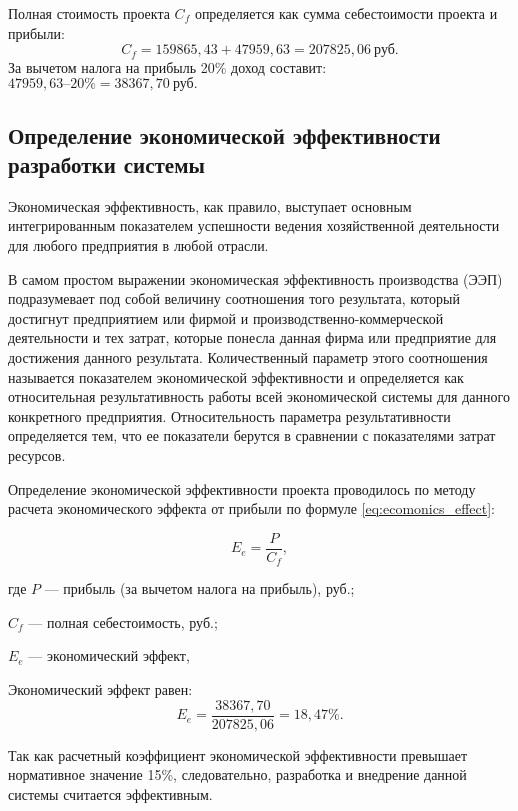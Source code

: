 Полная стоимость проекта $C_{f}$ определяется как сумма себестоимости проекта и прибыли:
$$C_{f} = 159865,43 + 47959,63 = 207825,06~\text{руб}.$$
За вычетом налога на прибыль 20\% доход составит: $ 47959,63 – 20\% = 38367,70~\text{руб}. $

\subsection{Определение экономической эффективности разработки системы}

Экономическая эффективность, как правило, выступает основным интегрированным показателем успешности ведения хозяйственной деятельности для любого предприятия в любой отрасли.

В самом простом выражении экономическая эффективность производства (ЭЭП) подразумевает под собой величину соотношения того результата, который достигнут предприятием или фирмой и производственно-коммерческой деятельности и тех затрат, которые понесла данная фирма или предприятие для достижения данного результата.
Количественный параметр этого соотношения называется показателем экономической эффективности и определяется как относительная результативность работы всей экономической системы для данного конкретного предприятия.
Относительность параметра результативности определяется тем, что ее показатели берутся в сравнении с показателями затрат ресурсов.

Определение экономической эффективности проекта проводилось по методу расчета экономического эффекта от прибыли по формуле \ref{eq:ecomonics_effect}:

\begin{equation}
	\label{eq:ecomonics_effect}
	E_{e} = \frac{P}{C_{f}},
\end{equation}
\begin{ESKDexplanation}
	\item где $P$ --- прибыль (за вычетом налога на прибыль), руб.;
	\item $C_{f}$ --- полная себестоимость, руб.;
	\item $E_{e}$ --- экономический эффект, %
\end{ESKDexplanation}

Экономический эффект равен: 
$$ E_{e} = \frac{38367,70}{207825,06} = 18,47\%. $$

Так как расчетный коэффициент экономической эффективности превышает нормативное значение 15\%, следовательно, разработка и внедрение данной системы считается эффективным.

